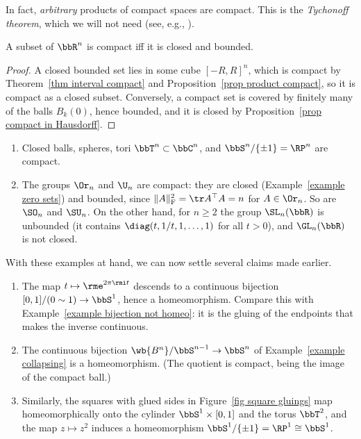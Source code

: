 In fact, \emph{arbitrary} products of compact spaces are compact. This is the \emph{Tychonoff theorem}, which we will not need (see, e.g., \cite{Munk}).

\begin{thm}\label{thm Heine-Borel}
    A subset of $\bbR^n$ is compact iff it is closed and bounded.
\end{thm}
\begin{proof}
    A closed bounded set lies in some cube $[-R,R]^n$, which is compact by Theorem~\ref{thm interval compact} and Proposition~\ref{prop product compact}, so it is compact as a closed subset. Conversely, a compact set is covered by finitely many of the balls $B_k(0)$, hence bounded, and it is closed by Proposition~\ref{prop compact in Hausdorff}.
\end{proof}

\begin{example}\label{example compact groups}
    \begin{enumerate}
        \item Closed balls, spheres, tori $\bbT^n\subset\bbC^n$, and $\bbS^n/\{\pm1\}=\RP^n$ are compact.
        \item The groups $\Or_n$ and $\U_n$ are compact: they are closed (Example~\ref{example zero sets}) and bounded, since $\lVert A\rVert_{\mathrm{F}}^2=\tr A^\top A=n$ for $A\in\Or_n$. So are $\SO_n$ and $\SU_n$. On the other hand, for $n\geq2$ the group $\SL_n(\bbR)$ is unbounded (it contains $\diag(t,1/t,1,\ldots,1)$ for all $t>0$), and $\GL_n(\bbR)$ is not closed.
    \end{enumerate}
\end{example}

With these examples at hand, we can now settle several claims made earlier.

\begin{example}\label{example compact quotients}
    \begin{enumerate}
        \item The map $t\mapsto\rme^{2\pi\rmi t}$ descends to a continuous bijection $[0,1]/(0\sim1)\to\bbS^1$, hence a homeomorphism. Compare this with Example~\ref{example bijection not homeo}: it is the gluing of the endpoints that makes the inverse continuous.
        \item The continuous bijection $\wb{B^n}/\bbS^{n-1}\to\bbS^n$ of Example~\ref{example collapsing} is a homeomorphism. (The quotient is compact, being the image of the compact ball.)
        \item Similarly, the squares with glued sides in Figure~\ref{fig square gluings} map homeomorphically onto the cylinder $\bbS^1\times[0,1]$ and the torus $\bbT^2$, and the map $z\mapsto z^2$ induces a homeomorphism $\bbS^1/\{\pm1\}=\RP^1\cong\bbS^1$.
    \end{enumerate}
\end{example}


